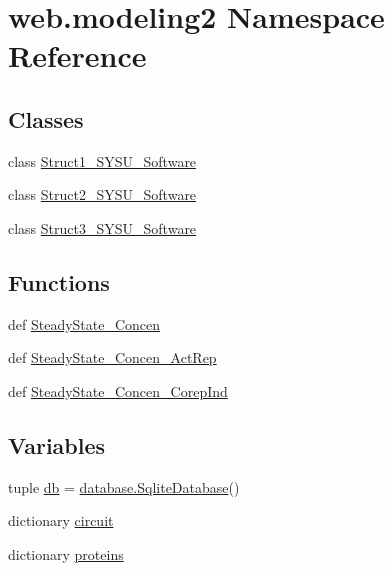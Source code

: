 \hypertarget{namespaceweb_1_1modeling2}{\section{web.\-modeling2 Namespace Reference}
\label{namespaceweb_1_1modeling2}
}
\subsection*{Classes}
\begin{DoxyCompactItemize}
\item 
class \hyperlink{classweb_1_1modeling2_1_1_struct1___s_y_s_u___software}{Struct1\-\_\-\-S\-Y\-S\-U\-\_\-\-Software}
\item 
class \hyperlink{classweb_1_1modeling2_1_1_struct2___s_y_s_u___software}{Struct2\-\_\-\-S\-Y\-S\-U\-\_\-\-Software}
\item 
class \hyperlink{classweb_1_1modeling2_1_1_struct3___s_y_s_u___software}{Struct3\-\_\-\-S\-Y\-S\-U\-\_\-\-Software}
\end{DoxyCompactItemize}
\subsection*{Functions}
\begin{DoxyCompactItemize}
\item 
def \hyperlink{namespaceweb_1_1modeling2_a94a4dd1113863222897b23466e0417d0}{Steady\-State\-\_\-\-Concen}
\item 
def \hyperlink{namespaceweb_1_1modeling2_ad14475cf6cc4bb4e2b08284f951aa7d2}{Steady\-State\-\_\-\-Concen\-\_\-\-Act\-Rep}
\item 
def \hyperlink{namespaceweb_1_1modeling2_a10bdeb8ee99c6b8ace79378384de76f0}{Steady\-State\-\_\-\-Concen\-\_\-\-Corep\-Ind}
\end{DoxyCompactItemize}
\subsection*{Variables}
\begin{DoxyCompactItemize}
\item 
tuple \hyperlink{namespaceweb_1_1modeling2_a6628c8cbbaee8f2ab5b9e73ca321c0bd}{db} = \hyperlink{classweb_1_1database_1_1_sqlite_database}{database.\-Sqlite\-Database}()
\item 
dictionary \hyperlink{namespaceweb_1_1modeling2_a12de35e18a887e18bda0900ab3ad5db1}{circuit}
\item 
dictionary \hyperlink{namespaceweb_1_1modeling2_a0f584bb39bca55bd6be2522fc91cb7de}{proteins}
\end{DoxyCompactItemize}


